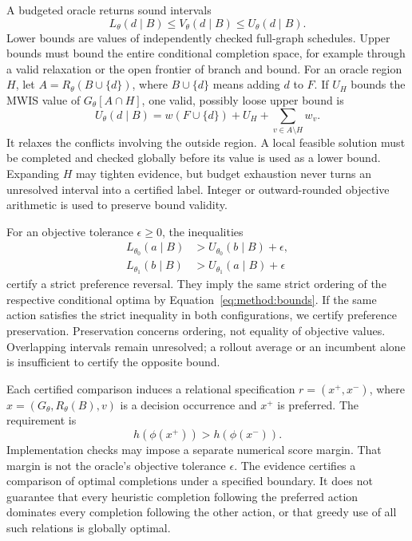 A budgeted oracle returns sound intervals
\begin{equation}
 L_\theta(d\mid B)\leq V_\theta(d\mid B)
 \leq U_\theta(d\mid B).
 \label{eq:method:bounds}
\end{equation}
Lower bounds are values of independently checked full-graph schedules.
Upper bounds must bound the entire conditional completion space, for
example through a valid relaxation or the open frontier of branch and
bound. For an oracle region $H$, let $A=R_\theta(B\cup\{d\})$, where
$B\cup\{d\}$ means adding $d$ to $F$. If $U_H$ bounds the MWIS value of
$G_\theta[A\cap H]$, one valid, possibly loose upper bound is
\begin{equation}
 U_\theta(d\mid B)=w(F\cup\{d\})+U_H
       +\sum_{v\in A\setminus H}w_v.
 \label{eq:method:localupper}
\end{equation}
It relaxes the conflicts involving the outside region. A local feasible
solution must be completed and checked globally before its value is used
as a lower bound. Expanding $H$ may tighten evidence, but budget exhaustion
never turns an unresolved interval into a certified label. Integer or
outward-rounded objective arithmetic is used to preserve bound validity.

For an objective tolerance $\epsilon\geq0$, the inequalities
\begin{equation}
 \begin{split}
 L_{\theta_0}(a\mid B)&>U_{\theta_0}(b\mid B)+\epsilon,\\
 L_{\theta_1}(b\mid B)&>U_{\theta_1}(a\mid B)+\epsilon
 \end{split}
 \label{eq:method:reversal}
\end{equation}
certify a strict preference reversal. They imply the same strict ordering
of the respective conditional optima by
Equation~\ref{eq:method:bounds}. If the same action satisfies the strict
inequality in both configurations, we certify preference preservation.
Preservation concerns ordering, not equality of objective values. Overlapping
intervals remain unresolved; a rollout average or an incumbent alone is
insufficient to certify the opposite bound.

Each certified comparison induces a relational specification
$r=(x^+,x^-)$, where $x=(G_\theta,R_\theta(B),v)$ is a decision occurrence
and $x^+$ is preferred. The requirement is
\begin{equation}
 h(\phi(x^+))>h(\phi(x^-)).
 \label{eq:method:requirement}
\end{equation}
Implementation checks may impose a separate numerical score margin.
That margin is not the oracle's objective tolerance $\epsilon$.
The evidence certifies a comparison of optimal completions under a
specified boundary. It does not guarantee that every heuristic completion
following the preferred action dominates every completion following the
other action, or that greedy use of all such relations is globally optimal.

